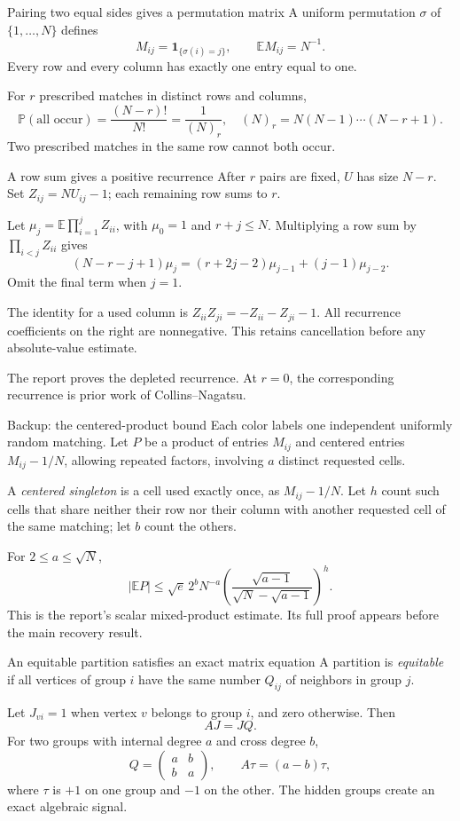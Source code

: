 \documentclass[aspectratio=169,11pt]{beamer}
\newcommand{\E}{\mathbb E}
\newcommand{\Prob}{\mathbb P}
\newcommand{\source}[1]{\par\vfill{\scriptsize\color{black!65}#1}}
\begin{document}
\begin{frame}{Pairing two equal sides gives a permutation matrix}
A uniform permutation $\sigma$ of $\{1,\ldots,N\}$ defines
\[
 M_{ij}=\mathbf 1_{\{\sigma(i)=j\}},\qquad \E M_{ij}=N^{-1}.
\]
Every row and every column has exactly one entry equal to one.

For $r$ prescribed matches in distinct rows and columns,
\[
 \Prob(\text{all occur})=\frac{(N-r)!}{N!}=\frac1{(N)_r},
 \quad (N)_r=N(N-1)\cdots(N-r+1).
\]
Two prescribed matches in the same row cannot both occur.
\end{frame}

\begin{frame}{A row sum gives a positive recurrence}
After $r$ pairs are fixed, $U$ has size $N-r$. Set
$Z_{ij}=NU_{ij}-1$; each remaining row sums to $r$.

Let $\mu_j=\E\prod_{i=1}^j Z_{ii}$, with $\mu_0=1$ and $r+j\le N$.
Multiplying a row sum by $\prod_{i<j}Z_{ii}$ gives
\[
 (N-r-j+1)\mu_j
 =(r+2j-2)\mu_{j-1}+(j-1)\mu_{j-2}.
\]
Omit the final term when $j=1$.

The identity for a used column is
$Z_{ii}Z_{ji}=-Z_{ii}-Z_{ji}-1$.
All recurrence coefficients on the right are nonnegative.
This retains cancellation before any absolute-value estimate.
\source{The report proves the depleted recurrence. At $r=0$, the corresponding recurrence is prior work of Collins--Nagatsu.}
\end{frame}

\begin{frame}{Backup: the centered-product bound}
\small
Each color labels one independent uniformly random matching.
Let $P$ be a product of entries $M_{ij}$ and centered entries $M_{ij}-1/N$,
allowing repeated factors, involving $a$ distinct requested cells.

A \emph{centered singleton} is a cell used exactly once, as $M_{ij}-1/N$.
Let $h$ count such cells that share neither their row nor their column
with another requested cell of the same matching; let $b$ count the others.

For $2\le a\le\sqrt N$,
\[
 |\E P|\le\sqrt e\,2^bN^{-a}
 \left(\frac{\sqrt{a-1}}{\sqrt N-\sqrt{a-1}}\right)^h.
\]
This is the report's scalar mixed-product estimate. Its full proof
appears before the main recovery result.
\end{frame}

\begin{frame}{An equitable partition satisfies an exact matrix equation}
A partition is \emph{equitable} if all vertices of group $i$ have the
same number $Q_{ij}$ of neighbors in group $j$.

Let $J_{vi}=1$ when vertex $v$ belongs to group $i$, and zero otherwise.
Then
\[
 AJ=JQ.
\]
For two groups with internal degree $a$ and cross degree $b$,
\[
 Q=\begin{pmatrix}a&b\\b&a\end{pmatrix},\qquad
 A\tau=(a-b)\tau,
\]
where $\tau$ is $+1$ on one group and $-1$ on the other.
The hidden groups create an exact algebraic signal.
\end{frame}
\end{document}
